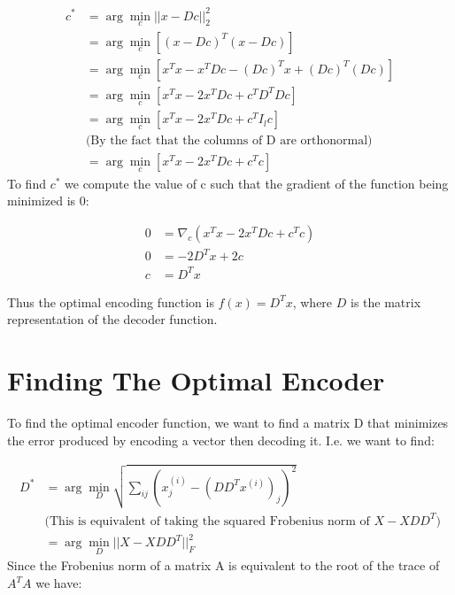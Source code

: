 \documentclass[12pt]{article}
\begin{document}
\begin{align*}
    c^*& = \displaystyle \arg \min_c || x - Dc||^2_2 \\
    &= \displaystyle \arg \min_c[(x - Dc)^T(x-Dc)] \\
    &= \displaystyle \arg \min_c[x^Tx - x^TDc - (Dc)^Tx + (Dc)^T(Dc)] \\
    &= \displaystyle \arg \min_c[x^Tx - 2x^TDc +  c^TD^TDc] \\
    &= \displaystyle \arg \min_c[x^Tx - 2x^TDc +  c^TI_lc] \\ 
    & \text{(By the fact that the columns of D are orthonormal)} \\ 
    &= \displaystyle \arg \min_c[x^Tx - 2x^TDc +  c^Tc]
\end{align*}
To find $c^*$ we compute the value of c such that the gradient of the function being minimized is 0:

\begin{align*}
    0 &= \nabla_c(x^Tx - 2x^TDc +  c^Tc) \\
    0 &= -2D^Tx + 2c \\
    c &= D^Tx
\end{align*}

Thus the optimal encoding function is $f(x) = D^Tx$, where $D$ is the matrix representation of the decoder function.

\section*{Finding The Optimal Encoder}
To find the optimal encoder function, we want to find a matrix D that minimizes the error produced by encoding a vector then decoding it. I.e. we want to find:

\begin{align*}
    D^* &= \displaystyle \arg \min_D \sqrt{{\sum_{ij}}(x_j^{(i)} - (DD^Tx^{(i)})_j)^2} \\
    & \text{(This is equivalent of taking the squared Frobenius norm of $X - XDD^T$}) \\
        &= \displaystyle \arg \min_D ||X - XDD^T||_F^2
\end{align*}
Since the Frobenius norm of a matrix A is equivalent to the root of the trace of $A^TA$ we have: 
\end{document}
